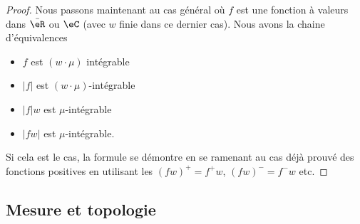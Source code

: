 \begin{proof}
    Nous passons maintenant au cas général où \( f\) est une fonction à valeurs dans \( \bar\eR\) ou \( \eC\) (avec \( w\) finie dans ce dernier cas). Nous avons la chaine d'équivalences
    \begin{itemize}
            \renewcommand{\labelitemi}{$\Leftrightarrow$}
        \item \( f\) est \( (w\cdot\mu)\) intégrable
        \item \( | f |\) est \( (w\cdot\mu)\)-intégrable
        \item \( | f |w\) est \( \mu\)-intégrable
        \item \( | fw |\) est \( \mu\)-intégrable.
    \end{itemize}

    Si cela est le cas, la formule se démontre en se ramenant au cas déjà prouvé des fonctions positives en utilisant les \( (fw)^+=f^+w\), \( (fw)^-=f^-w\) etc.
\end{proof}

\subsection{Mesure et topologie}

